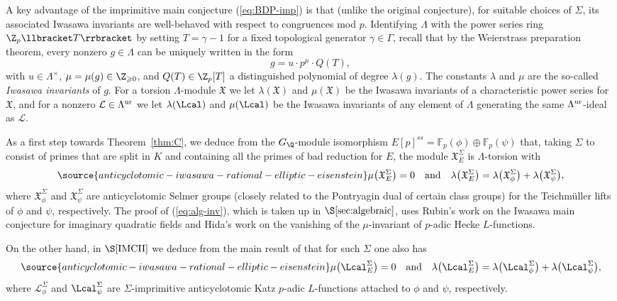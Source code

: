 A key advantage of the imprimitive main conjecture (\ref{eq:BDP-imp}) is that (unlike the original conjecture), for suitable choices of $\Sigma$, its associated Iwasawa invariants are well-behaved with respect to congruences mod $p$. Identifying $\Lambda$ with the power series ring $\Z_p\llbracket T\rrbracket$ by setting $T=\gamma-1$ for a fixed topological generator $\gamma\in\Gamma$, recall that by the Weierstrass preparation theorem,
every nonzero $g\in\Lambda$ can be uniquely written in the form
\[
g=u\cdot p^\mu\cdot Q(T),
\]
with $u\in\Lambda^\times$, $\mu=\mu(g)\in\Z_{\geqslant 0}$, and $Q(T)\in\Z_p[T]$ a distinguished polynomial of degree $\lambda(g)$. The constants $\lambda$ and $\mu$ are the so-called \emph{Iwasawa invariants} of $g$. For a torsion $\Lambda$-module $\mathfrak{X}$ we let $\lambda(\mathfrak{X})$ and $\mu(\mathfrak{X})$ be the Iwasawa invariants of a characteristic power series for $\mathfrak{X}$, and for a nonzero $\mathcal{L}\in\Lambda^{\rm ur}$ we let $\lambda(\Lcal)$ and $\mu(\Lcal)$ be the Iwasawa invariants of any element of $\Lambda$ generating the same $\Lambda^{\rm ur}$-ideal as $\mathcal{L}$.

As a first step towards Theorem~\ref{thm:C}, we deduce from the $G_\Q$-module isomorphism $E[p]^{ss}=\mathbb{F}_p(\phi)\oplus\mathbb{F}_p(\psi)$ that, taking $\Sigma$ to consist of primes that are split in $K$ and containing all the primes of bad reduction for $E$, the module $\mathfrak{X}_E^\Sigma$ is $\Lambda$-torsion with
\begin{equation}\label{eq:alg-inv}
\source{anticyclotomic-iwasawa-rational-elliptic-eisenstein}
\mu\bigl(\mathfrak{X}_E^\Sigma\bigr)=0\quad\textrm{and}\quad\lambda\bigl(\mathfrak{X}_E^\Sigma\bigr)=\lambda\bigl(\mathfrak{X}_\phi^\Sigma\bigr)+\lambda\bigl(\mathfrak{X}_\psi^\Sigma\bigr),
\end{equation}
where $\mathfrak{X}_\phi^\Sigma$ and $\mathfrak{X}_\psi^\Sigma$ are anticyclotomic Selmer groups (closely related to the Pontryagin dual of certain class groups) for the Teichm\"uller lifts of $\phi$ and $\psi$, respectively. The proof of (\ref{eq:alg-inv}), which is taken up in $\S\ref{sec:algebraic}$, uses Rubin's work \cite{rubinmainconj} on the Iwasawa main conjecture for imaginary quadratic fields and Hida's work \cite{hidamu-0} on the vanishing of the $\mu$-invariant of $p$-adic Hecke $L$-functions.

On the other hand, in $\S\ref{IMCII}$ we deduce from the main result of \cite{kriz} that for such $\Sigma$ one also has
\begin{equation}\label{eq:an-inv}
\source{anticyclotomic-iwasawa-rational-elliptic-eisenstein}
\mu\bigl(\Lcal_E^\Sigma\bigr)=0\quad\textrm{and}\quad\lambda\bigl(\Lcal_E^\Sigma\bigr)=\lambda\bigl(\Lcal_\phi^\Sigma\bigr)+\lambda\bigl(\Lcal_\psi^\Sigma\bigr),
\end{equation}
where $\mathcal{L}_\phi^\Sigma$ and $\Lcal_\psi^\Sigma$ are $\Sigma$-imprimitive anticyclotomic Katz $p$-adic $L$-functions attached to $\phi$ and $\psi$, respectively.

